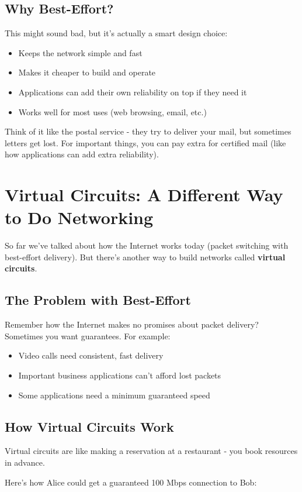 \documentclass[../../compsys.tex]{subfiles}
\begin{document}
\subsection{Why Best-Effort?}
This might sound bad, but it's actually a smart design choice:
\begin{itemize}
    \item Keeps the network simple and fast
    \item Makes it cheaper to build and operate
    \item Applications can add their own reliability on top if they need it
    \item Works well for most uses (web browsing, email, etc.)
\end{itemize}

Think of it like the postal service - they try to deliver your mail, but sometimes letters get lost. For important things, you can pay extra for certified mail (like how applications can add extra reliability).
\newpage

\section{Virtual Circuits: A Different Way to Do Networking}
So far we've talked about how the Internet works today (packet switching with best-effort delivery). But there's another way to build networks called \textbf{virtual circuits}.
\subsection{The Problem with Best-Effort}
Remember how the Internet makes no promises about packet delivery? Sometimes you want guarantees. For example:
\begin{itemize}
    \item Video calls need consistent, fast delivery
    \item Important business applications can't afford lost packets
    \item Some applications need a minimum guaranteed speed
\end{itemize}
\subsection{How Virtual Circuits Work}
Virtual circuits are like making a reservation at a restaurant - you book resources in advance.

Here's how Alice could get a guaranteed 100 Mbps connection to Bob:
\end{document}
